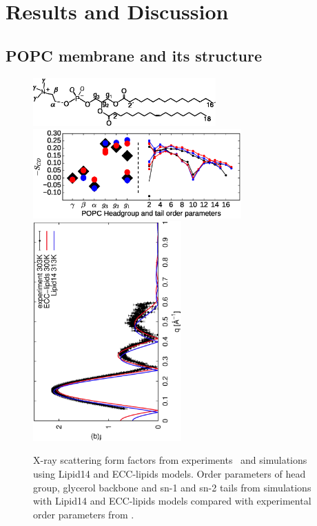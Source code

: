 \documentclass[aip,jcp,twocolumn]{revtex4}
\begin{document}
\section{Results and Discussion}

\subsection{POPC membrane and its structure}

\begin{figure}[tbp]
  \centering
  \includegraphics[width=7.0cm]{../Fig/POPCstructure.eps}
  \includegraphics[width=8.0cm]{../Fig/ipython_nb/Order-parameters_exp-L14-ECCL17_q80_sig89.eps}
  \includegraphics[height=8.4cm,angle=-90]{../Fig/form-f_exp-l14-eccl17.eps}
  \caption{\label{simVSexpNOions}
    X-ray scattering form factors from experiments~\cite{Kucerka2011} and simulations using Lipid14 \cite{dickson14} and ECC-lipids models. 
    Order parameters of head group, glycerol backbone and sn-1 and sn-2 tails  from simulations with Lipid14 \cite{dickson14} and ECC-lipids models
    compared with experimental order parameters from \cite{ferreira13}.}
\end{figure}
\end{document}

